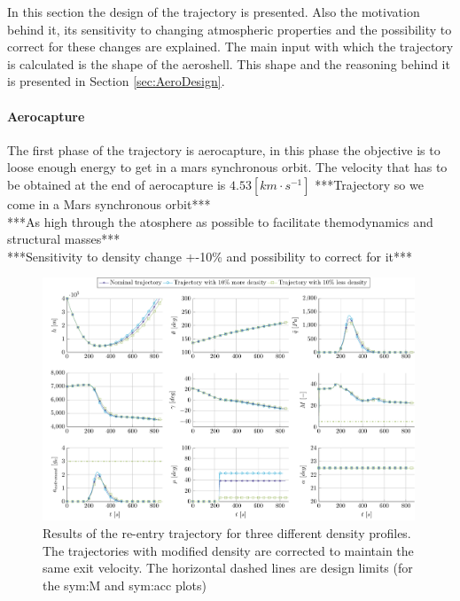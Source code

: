 In this section the design of the trajectory is presented. Also the motivation behind it, its sensitivity to changing atmospheric properties and the possibility to correct for these changes are explained. The main input with which the trajectory is calculated is the shape of the aeroshell. This shape and the reasoning behind it is presented in Section \ref{sec:AeroDesign}.

\paragraph{Aerocapture}
The first phase of the trajectory is aerocapture, in this phase the objective is to loose enough energy to get in a mars synchronous orbit. The velocity that has to be obtained at the end of aerocapture is $4.53 \left[km \cdot s^{-1}\right]$
***Trajectory so we come in a Mars synchronous orbit***\\
***As high through the atosphere as possible to facilitate themodynamics and structural masses***\\

***Sensitivity to density change +-10\% and possibility to correct for it***\\
\begin{figure}
	\centering
	\includegraphics[width=0.99\textwidth]{Figure/Orbit/sensitivity_aerocapture.pdf}
	\caption{ Results of the re-entry trajectory for three different density profiles. The trajectories with modified density are corrected to maintain the same exit velocity. The horizontal dashed lines are design limits (for the \gls{sym:M} and \gls{sym:acc} plots) }
	\label{fig:orbit_aerocapture_data}
\end{figure}

